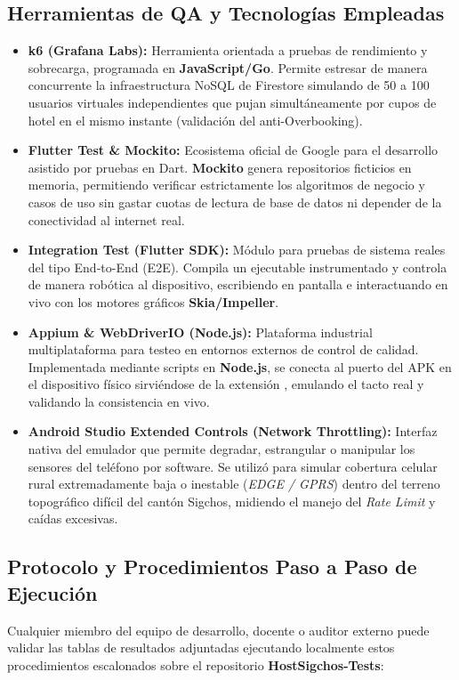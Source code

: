 \documentclass[12pt,letterpaper]{report}
\newcommand{\tech}[1]{\textbf{#1}}
\newcommand{\pathtext}[1]{\texttt{\detokenize{#1}}}
\begin{document}
\subsection{Herramientas de QA y Tecnologías Empleadas}
\begin{itemize}
    \item \textbf{k6 (Grafana Labs):} Herramienta orientada a pruebas de rendimiento y sobrecarga, programada en \tech{JavaScript/Go}. Permite estresar de manera concurrente la infraestructura NoSQL de Firestore simulando de 50 a 100 usuarios virtuales independientes que pujan simultáneamente por cupos de hotel en el mismo instante (validación del anti-Overbooking).
    \item \textbf{Flutter Test \& Mockito:} Ecosistema oficial de Google para el desarrollo asistido por pruebas en Dart. \tech{Mockito} genera repositorios ficticios en memoria, permitiendo verificar estrictamente los algoritmos de negocio y casos de uso sin gastar cuotas de lectura de base de datos ni depender de la conectividad al internet real.
    \item \textbf{Integration Test (Flutter SDK):} Módulo para pruebas de sistema reales del tipo End-to-End (E2E). Compila un ejecutable instrumentado y controla de manera robótica al dispositivo, escribiendo en pantalla e interactuando en vivo con los motores gráficos \tech{Skia/Impeller}.
    \item \textbf{Appium \& WebDriverIO (Node.js):} Plataforma industrial multiplataforma para testeo en entornos externos de control de calidad. Implementada mediante scripts en \tech{Node.js}, se conecta al puerto del APK en el dispositivo físico sirviéndose de la extensión \pathtext{appium-flutter-driver}, emulando el tacto real y validando la consistencia en vivo.
    \item \textbf{Android Studio Extended Controls (Network Throttling):} Interfaz nativa del emulador que permite degradar, estrangular o manipular los sensores del teléfono por software. Se utilizó para simular cobertura celular rural extremadamente baja o inestable (\textit{EDGE / GPRS}) dentro del terreno topográfico difícil del cantón Sigchos, midiendo el manejo del \textit{Rate Limit} y caídas excesivas.
\end{itemize}

\subsection{Protocolo y Procedimientos Paso a Paso de Ejecución}
Cualquier miembro del equipo de desarrollo, docente o auditor externo puede validar las tablas de resultados adjuntadas ejecutando localmente estos procedimientos escalonados sobre el repositorio \textbf{HostSigchos-Tests}:
\end{document}
